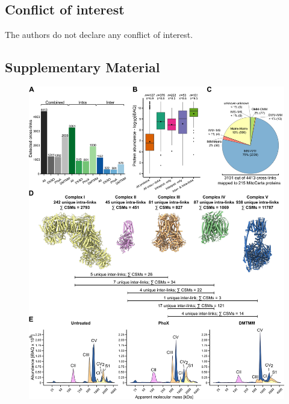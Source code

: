 \subsection*{Conflict of interest}
The authors do not declare any conflict of interest.
%
\clearpage
\begin{subappendices}
    \section{Supplementary Material}
    \begin{figure}[hb!]
        \center
        \includegraphics[]{Chapter.3/Figures/SI_Figure1.png}
        \caption{}
        \label{fig:ch3_app_fig1}
    \end{figure}
    \addtocounter{figure}{-1}
    \begin{figure}[ht!]

\end{figure}
\end{subappendices}
